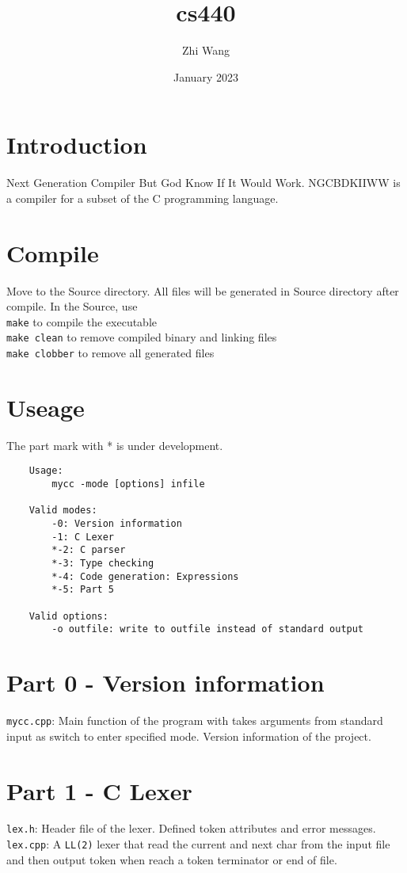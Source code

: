 \documentclass{article}
\title{cs440}
\author{Zhi Wang}
\date{January 2023}
\begin{document}
\maketitle

\section{Introduction}
Next Generation Compiler But God Know If It Would Work.
NGCBDKIIWW is a compiler for a subset of the C programming language.

\section{Compile}
Move to the Source directory.
All files will be generated in Source directory after compile.
In the Source, use\\
{\tt make} to compile the executable\\
{\tt make clean} to remove compiled binary and linking files\\
{\tt make clobber} to remove all generated files

\section{Useage}
The part mark with * is under development.

\begin{verbatim}
	Usage:
		mycc -mode [options] infile

	Valid modes:
		-0: Version information
		-1: C Lexer
		*-2: C parser
		*-3: Type checking
		*-4: Code generation: Expressions
		*-5: Part 5

	Valid options:
		-o outfile: write to outfile instead of standard output
\end{verbatim}


\section{Part 0 - Version information}
{\tt mycc.cpp}:
Main function of the program with takes arguments from standard input 
as switch to enter specified mode.
Version information of the project.

\section{Part 1 - C Lexer}
{\tt lex.h}:
Header file of the lexer. 
Defined token attributes and error messages.
{\smallskip}
{\tt lex.cpp}: 
A {\tt LL(2)} lexer that read the current and 
next char from the input file and then output token
when reach a token terminator or end of file.
\end{document}
